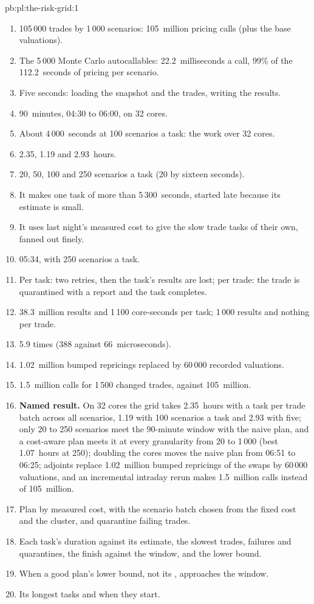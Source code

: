 \begin{solution}{pb:pl:the-risk-grid:1}
\begin{enumerate}
\item 105\,000 trades by 1\,000 scenarios: 105~million pricing calls (plus the base valuations).
\item The 5\,000 Monte Carlo autocallables: 22.2~milliseconds a call, 99\% of the 112.2~seconds of pricing per scenario.
\item Five seconds: loading the snapshot and the trades, writing the results.
\item 90~minutes, 04:30 to 06:00, on 32 cores.
\item About 4\,000~seconds at 100 scenarios a task: the work over 32 cores.
\item 2.35, 1.19 and 2.93~hours.
\item 20, 50, 100 and 250 scenarios a task (20 by sixteen seconds).
\item It makes one task of more than 5\,300~seconds, started late because its estimate is small.
\item It uses last night's measured cost to give the slow trade tasks of their own, fanned out finely.
\item 05:34, with 250 scenarios a task.
\item Per task: two retries, then the task's results are lost; per trade: the trade is quarantined with a report and the task completes.
\item 38.3~million results and 1\,100 core-seconds per task; 1\,000 results and nothing per trade.
\item 5.9 times (388 against 66~microseconds).
\item 1.02~million bumped repricings replaced by 60\,000 recorded valuations.
\item 1.5~million calls for 1\,500 changed trades, against 105~million.
\item \textbf{Named result.} On 32 cores the grid takes 2.35~hours with a task per trade batch across all scenarios, 1.19 with 100 scenarios
a task and 2.93 with five; only 20 to 250 scenarios meet the 90-minute window with the naive plan, and a cost-aware plan meets it at every
granularity from 20 to 1\,000 (best 1.07~hours at 250); doubling the cores moves the naive plan from 06:51 to 06:25; adjoints replace 1.02~million
bumped repricings of the swaps by 60\,000 valuations, and an incremental intraday rerun makes 1.5~million calls instead of 105~million.
\item Plan by measured cost, with the scenario batch chosen from the fixed cost and the cluster, and quarantine failing trades.
\item Each task's duration against its estimate, the slowest trades, failures and quarantines, the finish against the window, and the lower
bound.
\item When a good plan's lower bound, not its , approaches the window.
\item Its longest tasks and when they start.
\end{enumerate}
\end{solution}

